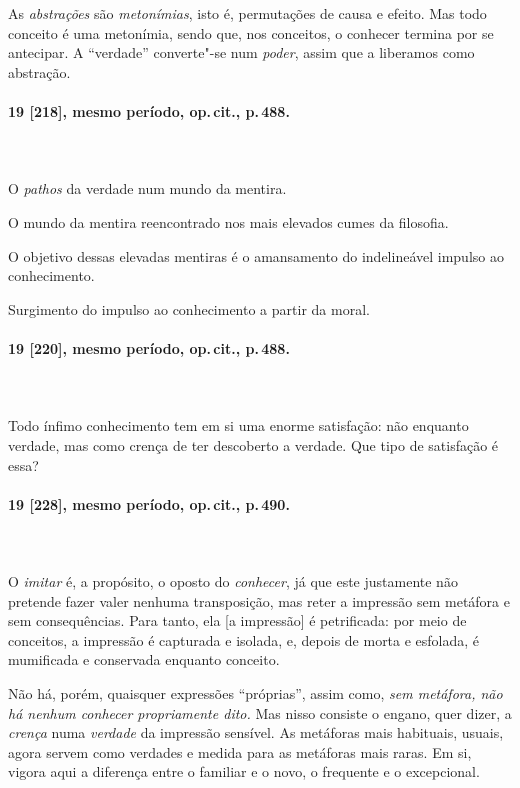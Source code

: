 As \textit{abstrações} são \textit{metonímias}, isto é, permutações de
causa e efeito. Mas todo conceito é uma metonímia, sendo que, nos
conceitos, o conhecer termina por se antecipar. A “verdade”
converte"-se num \textit{poder}, assim que a liberamos como
abstração. 

\pagebreak
\paragraph*{19 [218], mesmo período, op.\,cit., p.\,488.}
\ \\
\ \\

O \textit{pathos} da verdade num mundo da mentira.

O mundo da mentira reencontrado nos mais elevados cumes da filosofia.

O objetivo dessas elevadas mentiras é o amansamento do indelineável
impulso ao conhecimento. 

Surgimento do impulso ao conhecimento a partir da moral.

\pagebreak
\paragraph*{19 [220], mesmo período, op.\,cit., p.\,488.}
\ \\
\ \\

Todo ínfimo conhecimento tem em si uma enorme satisfação: não enquanto
verdade, mas como crença de ter descoberto a verdade. Que tipo de
satisfação é essa?

\pagebreak
\paragraph*{19 [228], mesmo período, op.\,cit., p.\,490.}
\ \\
\ \\

O \textit{imitar} é, a propósito, o oposto do \textit{conhecer}, já que
este justamente não pretende fazer valer nenhuma transposição, mas
reter a impressão sem metáfora e sem consequências. Para tanto, ela [a
impressão] é petrificada: por meio de conceitos, a impressão é
capturada e isolada, e, depois de morta e esfolada, é mumificada e
conservada enquanto conceito.

Não há, porém, quaisquer expressões “próprias”, assim como, \textit{sem
metáfora, não há nenhum conhecer propriamente dito.} Mas nisso consiste
o engano, quer dizer, a \textit{crença} numa \textit{verdade} da
impressão sensível. As metáforas mais habituais, usuais, agora servem
como verdades e medida para as metáforas mais raras. Em si, vigora aqui
a diferença entre o familiar e o novo, o frequente e o excepcional.

